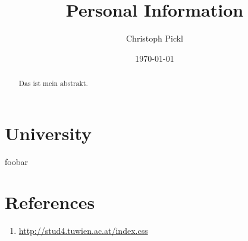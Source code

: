 \documentclass[a4paper]{article}
\title{Personal Information}
\author{Christoph Pickl}
\date{\today}
\begin{document}
\maketitle

\begin{abstract}
    Das ist mein abstrakt.
\end{abstract}

\tableofcontents



\section{University}
foobar

\section{References}

\begin{enumerate}
    \item \url{http://stud4.tuwien.ac.at/index.css}
\end{enumerate}
\end{document}
